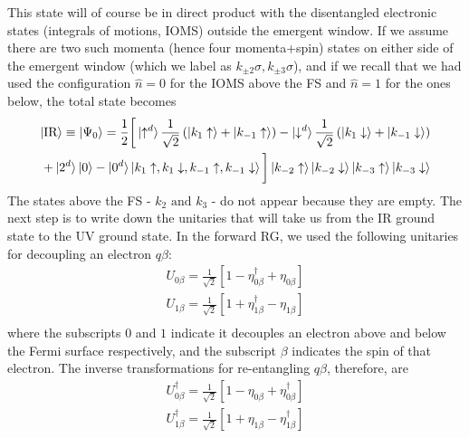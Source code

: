 \documentclass[12pt,twoside]{article}
\numberwithin{equation}{section}
\begin{document}
This state will of course be in direct product with the disentangled electronic states (integrals of motions, IOMS) outside the emergent window. If we assume there are two such momenta (hence four momenta+spin) states on either side of the emergent window (which we label as \(k_{\pm 2}\sigma, k_{\pm 3}\sigma\)), and if we recall that we had used the configuration \(\hat n=0\) for the IOMS above the FS and \(\hat n =1\) for the ones below, the total state becomes
\begin{equation}\begin{aligned}
	\ket{\text{IR}} \equiv \ket{\Psi_0} = \frac{1}{2}\bigg[\ket{\uparrow^d}\frac{1}{\sqrt 2}\left(\ket{k_1 \uparrow} + \ket{k_{-1} \uparrow}\right) - \ket{\downarrow^d}\frac{1}{\sqrt 2}\left(\ket{k_1 \downarrow} + \ket{k_{-1} \downarrow}\right) \\
		+ \ket{2^d}\ket{0} - \ket{0^d}\ket{k_1 \uparrow, k_1 \downarrow,k_{-1} \uparrow,k_{-1} \downarrow}\bigg]\ket{k_{-2} \uparrow} \ket{k_{-2} \downarrow} \ket{k_{-3} \uparrow} \ket{k_{-3} \downarrow} 
\end{aligned}\end{equation}
The states above the FS - \(k_2 \text{ and } k_3\) - do not appear because they are empty. The next step is to write down the unitaries that will take us from the IR ground state to the UV ground state. In the forward RG, we used the following unitaries for decoupling an electron \(q\beta\):
\begin{equation}\begin{aligned}
	U_{0\beta} = \frac{1}{\sqrt 2}\left[1 - \eta_{0\beta}^\dagger + \eta_{0\beta} \right] \\
	U_{1\beta} = \frac{1}{\sqrt 2}\left[1 + \eta_{1\beta}^\dagger - \eta_{1\beta} \right] \\
\end{aligned}\end{equation}
where the subscripts \(0\) and \(1\) indicate it decouples an electron above and below the Fermi surface respectively, and the subscript \(\beta\) indicates the spin of that electron. The inverse transformations for re-entangling \(q\beta\), therefore, are
\begin{equation}\begin{aligned}
	U^\dagger_{0\beta} = \frac{1}{\sqrt 2}\left[1 - \eta_{0\beta} + \eta_{0\beta}^\dagger \right] \\
	U^\dagger_{1\beta} = \frac{1}{\sqrt 2}\left[1 + \eta_{1\beta} - \eta_{1\beta}^\dagger \right] \\
\end{aligned}\end{equation}
\end{document}
